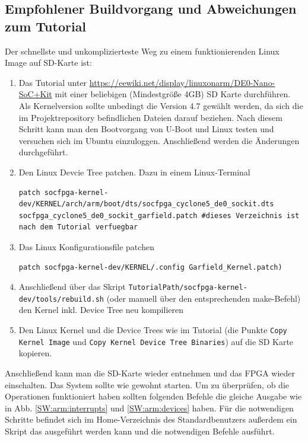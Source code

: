 \subsection{Empfohlener Buildvorgang und Abweichungen zum Tutorial}
Der schnellste und unkomplizierteste Weg zu einem funktionierenden Linux Image auf SD-Karte ist:
\begin{enumerate}
	\item Das Tutorial unter \href{https://eewiki.net/display/linuxonarm/DE0-Nano-SoC+Kit}{https://eewiki.net/display/linuxonarm/DE0-Nano-SoC+Kit} mit einer beliebigen (Mindestgröße 4GB) SD Karte durchführen. Als Kernelversion sollte unbedingt die Version 4.7 gewählt werden, da sich die im Projektrepository befindlichen Dateien darauf beziehen. Nach diesem Schritt kann man den Bootvorgang von U-Boot und Linux testen und versuchen sich im Ubuntu einzuloggen. Anschließend werden die Änderungen durchgeführt.
	\item Den Linux Devcie Tree patchen. Dazu in einem Linux-Terminal
\lstset{language=bash}
	\begin{lstlisting}[breaklines=true]
patch socfpga-kernel-dev/KERNEL/arch/arm/boot/dts/socfpga_cyclone5_de0_sockit.dts socfpga_cyclone5_de0_sockit_garfield.patch #dieses Verzeichnis ist nach dem Tutorial verfuegbar
	\end{lstlisting}
	\item Das Linux Konfigurationsfile patchen
	\begin{lstlisting}[breaklines=true]
patch socfpga-kernel-dev/KERNEL/.config Garfield_Kernel.patch)
	\end{lstlisting}
	\item Anschließend über das Skript \texttt{TutorialPath/socfpga-kernel-dev/tools/rebuild.sh} (oder manuell über den entsprechenden make-Befehl) den Kernel inkl. Device Tree neu kompilieren
	\item Den Linux Kernel und die Device Trees wie im Tutorial (die Punkte \texttt{Copy Kernel Image} und \texttt{Copy Kernel Device Tree Binaries}) auf die SD Karte kopieren.
\end{enumerate}

Anschließend kann man die SD-Karte wieder entnehmen und das \ac{FPGA} wieder einschalten. Das System sollte wie gewohnt starten. Um zu überprüfen, ob die Operationen funktioniert haben sollten folgenden Befehle die gleiche Ausgabe wie in Abb. \ref{SW:arm:interrupts} und \ref{SW:arm:devices} haben. Für die notwendigen Schritte befindet sich im Home-Verzeichnis des Standardbenutzers außerdem ein Skript das ausgeführt werden kann und die notwendigen Befehle ausführt.

